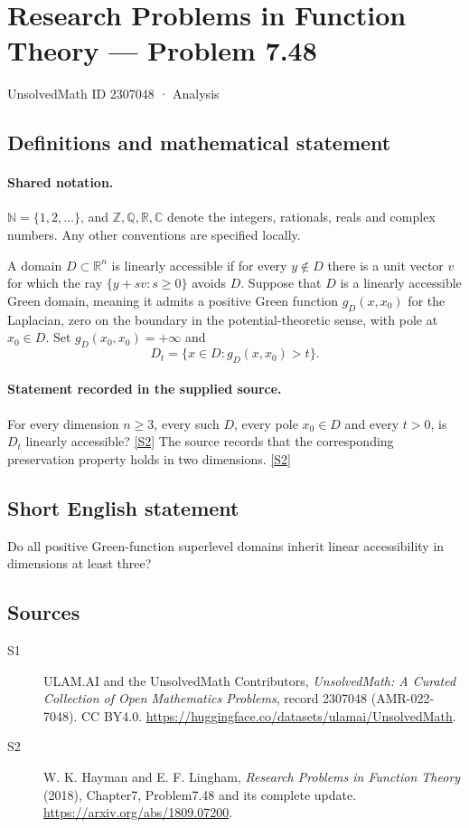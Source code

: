 \documentclass[11pt]{article}
\newcommand{\sref}[2]{\hyperlink{source:#1:#2}{[S#2]}}
\begin{document}
\setcounter{section}{2307047}
\section{Research Problems in Function Theory — Problem 7.48}\label{2307048}
{\small\sffamily UnsolvedMath ID 2307048 · Analysis}
\subsection{Definitions and mathematical statement}

\paragraph{Shared notation.}$\mathbb N=\{1,2,\ldots\}$, and $\mathbb Z,\mathbb Q,\mathbb R,\mathbb C$ denote the integers, rationals, reals and complex numbers. Any other conventions are specified locally.


A domain $D\subset\mathbb R^n$ is linearly accessible if for every $y\notin D$ there is a unit vector $v$ for which the ray $\{y+sv:s\ge0\}$ avoids $D$. Suppose that $D$ is a linearly accessible Green domain, meaning it admits a positive Green function $g_D(x,x_0)$ for the Laplacian, zero on the boundary in the potential-theoretic sense, with pole at $x_0\in D$. Set $g_D(x_0,x_0)=+\infty$ and
\[D_t=\{x\in D:g_D(x,x_0)>t\}.\]

\paragraph{Statement recorded in the supplied source.}
For every dimension $n\ge3$, every such $D$, every pole $x_0\in D$ and every $t>0$, is $D_t$ linearly accessible? \sref{2307048}{2}
The source records that the corresponding preservation property holds in two dimensions. \sref{2307048}{2}
\subsection{Short English statement}
Do all positive Green-function superlevel domains inherit linear accessibility in dimensions at least three?
\subsection{Sources}
\begin{description}
\item[\hypertarget{source:2307048:1}{S1}] ULAM.AI and the UnsolvedMath Contributors, \emph{UnsolvedMath: A Curated Collection of Open Mathematics Problems}, record 2307048 (AMR-022-7048). CC BY4.0. \url{https://huggingface.co/datasets/ulamai/UnsolvedMath}.
\item[\hypertarget{source:2307048:2}{S2}] W. K. Hayman and E. F. Lingham, \emph{Research Problems in Function Theory} (2018), Chapter7, Problem7.48 and its complete update. \url{https://arxiv.org/abs/1809.07200}.
\end{description}
\label{end:2307048}
\end{document}
